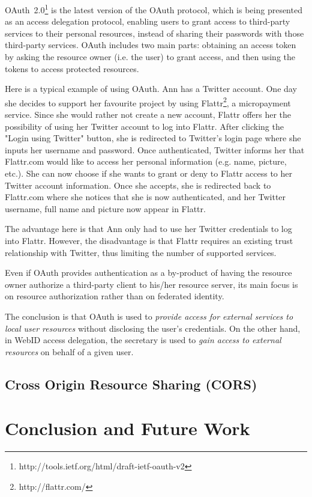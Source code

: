 \documentclass[a4paper]{llncs}
\begin{document}
OAuth~2.0\footnote{http://tools.ietf.org/html/draft-ietf-oauth-v2} is the latest version of the OAuth protocol, which is being presented as an access delegation protocol, enabling users to grant access to third-party services to their personal resources, instead of sharing their passwords with those third-party services. OAuth includes two main parts: obtaining an access token by asking the resource owner (i.e. the user) to grant access, and then using the tokens to access protected resources. 

Here is a typical example of using OAuth. Ann has a Twitter account. One day she decides to support her favourite project by using Flattr\footnote{http://flattr.com/}, a micropayment service. Since she would rather not create a new account, Flattr offers her the possibility of using her Twitter account to log into Flattr. After clicking the "Login using Twitter" button, she is redirected to Twitter's login page where she inputs her username and password. Once authenticated, Twitter informs her that Flattr.com would like to access her personal information (e.g. name, picture, etc.). She can now choose if she wants to grant or deny to Flattr access to her Twitter account information. Once she accepts, she is redirected back to Flattr.com where she notices that she is now authenticated, and her Twitter username, full name and picture now appear in Flattr.

The advantage here is that Ann only had to use her Twitter credentials to log into Flattr. However, the disadvantage is that Flattr requires an existing trust relationship with Twitter, thus limiting the number of supported services.

Even if OAuth provides authentication as a by-product of having the resource owner authorize a third-party client to his/her resource server, its main focus is on resource authorization rather than on federated identity.

The conclusion is that OAuth is used to \textit{provide access for external services to local user resources} without disclosing the user's credentials. On the other hand, in WebID access delegation, the secretary is used to \textit{gain access to external resources} on behalf of a given user.

\subsection{Cross Origin Resource Sharing (CORS)}

\section{Conclusion and Future Work}\label{sec:conclusion}




\end{document}
